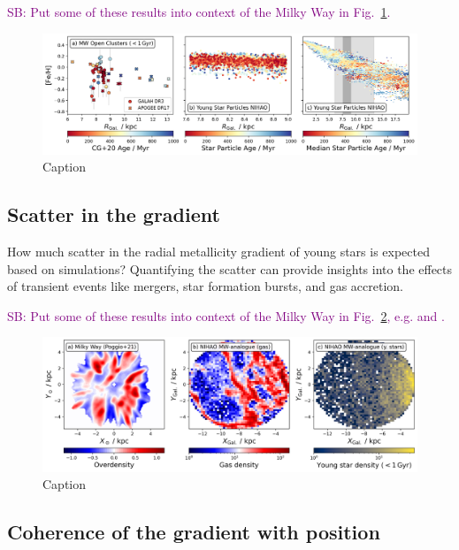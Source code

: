 \documentclass[fleqn,usenatbib]{mnras}
\newcommand{\SB}[1]{{\textcolor{purple}{SB: #1}}}
\begin{document}
\SB{Put some of these results into context of the Milky Way in Fig.~\ref{fig:radial_metallicity_gradients_mw_vs_nihao}.}

\begin{figure}
    \centering
    \includegraphics[width=\textwidth]{figures/radial_metallicity_gradients_mw_vs_nihao.png}
    \caption{Caption}
    \label{fig:radial_metallicity_gradients_mw_vs_nihao}
\end{figure}

\subsection{Scatter in the gradient} \label{sec:discussion_scatter}

How much scatter in the radial metallicity gradient of young stars is expected based on simulations? Quantifying the scatter can provide insights into the effects of transient events like mergers, star formation bursts, and gas accretion.

\SB{Put some of these results into context of the Milky Way in Fig.~\ref{fig:overdensities_mw_vs_nihao}, e.g. \citet{Poggio2021} and \citet{Hackshaw2024}.}

\begin{figure}
    \centering
    \includegraphics[width=\textwidth]{figures/overdensities_mw_vs_nihao.png}
    \caption{Caption}
    \label{fig:overdensities_mw_vs_nihao}
\end{figure}

\subsection{Coherence of the gradient with position} \label{sec:discussion_coherence_position}
\end{document}
